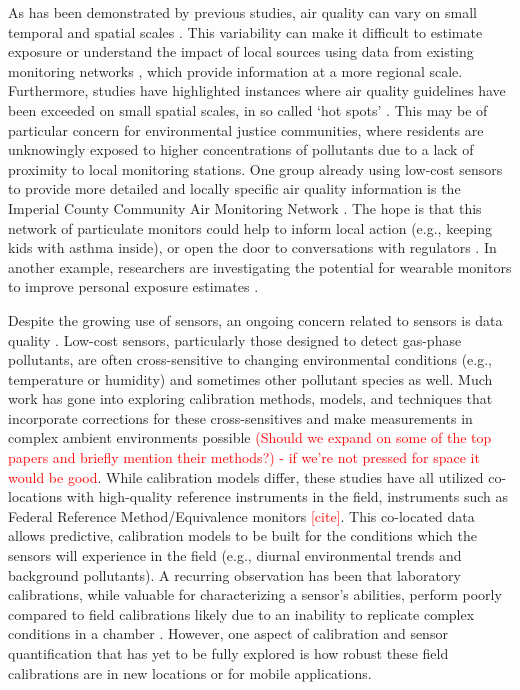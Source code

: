 \documentclass[journal abbreviation, manuscript]{copernicus}
\newcommand\todo[1]{\textcolor{red}{#1}}
\begin{document}
As has been demonstrated by previous studies, air quality can vary on small temporal and spatial scales \citep{Monn1997, Wheeler2008}. This variability can make it difficult to estimate exposure or understand the impact of local sources using data from existing monitoring networks \citep{Wilson2005}, which provide information at a more regional scale. Furthermore, studies have highlighted instances where air quality guidelines have been exceeded on small spatial scales, in so called ‘hot spots’ \citep{Wu2012}. This may be of particular concern for environmental justice communities, where residents are unknowingly exposed to higher concentrations of pollutants due to a lack of proximity to local monitoring stations. One group already using low-cost sensors to provide more detailed and locally specific air quality information is the Imperial County Community Air Monitoring Network \citep{English2016}. The hope is that this network of particulate monitors could help to inform local action (e.g., keeping kids with asthma inside), or open the door to conversations with regulators \citep{English2016}. In another example, researchers are investigating the potential for wearable monitors to improve personal exposure estimates \citep{Jerrett2017}. 

Despite the growing use of sensors, an ongoing concern related to sensors is data quality \citep{Clements2017}. Low-cost sensors, particularly those designed to detect gas-phase pollutants, are often cross-sensitive to changing environmental conditions (e.g., temperature or humidity) and sometimes other pollutant species as well.  Much work has gone into exploring calibration methods, models, and techniques that incorporate corrections for these cross-sensitives and make measurements in complex ambient environments possible \citep{Spinelle2014, Spinelle2015, Cross2017, Sadighi2018, Zimmerman2018} \todo{(Should we expand on some of the top papers and briefly mention their methods?) - if we're not pressed for space it would be good}. While calibration models differ, these studies have all utilized co-locations with high-quality reference instruments in the field, instruments such as Federal Reference Method/Equivalence monitors \todo{[cite]}. This co-located data allows predictive, calibration models to be built for the conditions which the sensors will experience in the field (e.g., diurnal environmental trends and background pollutants). A recurring observation has been that laboratory calibrations, while valuable for characterizing a sensor’s abilities, perform poorly compared to field calibrations likely due to an inability to replicate complex conditions in a chamber \citep{Piedrahita2014, Castell2017}. However, one aspect of calibration and sensor quantification that has yet to be fully explored is how robust these field calibrations are in new locations or for mobile applications. 
\end{document}
